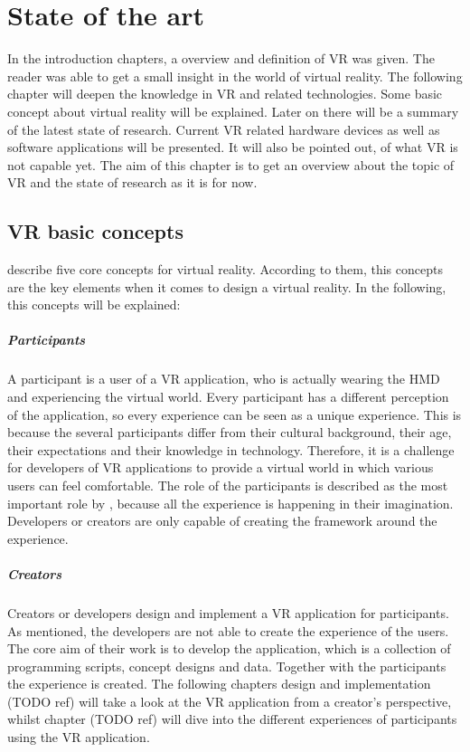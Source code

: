 \chapter{State of the art}
In the introduction chapters, a overview and definition of VR was given. The reader was able to get a small insight in the world of virtual reality. The following chapter will deepen the knowledge in VR and related technologies. Some basic concept about virtual reality will be explained. Later on there will be a summary of the latest state of research. Current VR related hardware devices as well as software applications will be presented. It will also be pointed out, of what VR is not capable yet. The aim of this chapter is to get an overview about the topic of VR and the state of research as it is for now.
\section{VR basic concepts}
\cite{Sherman.2019} describe five core concepts for virtual reality.  According to them, this concepts are the key elements when it comes to design a virtual reality. In the following, this concepts will be explained:
\paragraph{Participants} A participant is a user of a VR application, who is actually wearing the HMD and experiencing the virtual world. Every participant has a different perception of the application, so every experience can be seen as a unique experience. This is because the several participants differ from their cultural background, their age, their expectations and their knowledge in technology. Therefore, it is a challenge for developers of VR applications to provide a virtual world in which various users can feel comfortable. The role of the participants is described as the most important role by \cite{Sherman.2019}, because all the experience is happening in their imagination. Developers or creators are only capable of creating the framework around the experience.
\paragraph{Creators} Creators or developers design and implement a VR application for participants. As mentioned, the developers are not able to create the experience of the users. The core aim of their work is to develop the application, which is a collection of programming scripts, concept designs and data. Together with the participants the experience is created. The following chapters design and implementation (TODO ref) will take a look at the VR application from a creator's perspective, whilst chapter (TODO ref) will dive into the different experiences of participants using the VR application.
